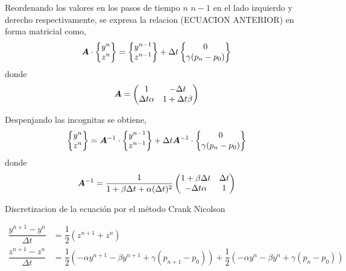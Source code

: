 Reordenando los valores en los pasos de tiempo $n$ $n-1$ en el lado izquierdo y derecho respectivamente, se expresa la relacion (ECUACION ANTERIOR) en forma matricial como,
\begin{equation}
\boldsymbol{A} \cdot \begin{Bmatrix}
y^n \\ z^n
\end{Bmatrix} =
\begin{Bmatrix}
y^{n-1} \\ z^{n-1}
\end{Bmatrix} +
\Delta t \begin{Bmatrix}
0 \\ \gamma (p_n-p_0)
\end{Bmatrix}
\end{equation}
donde
\begin{equation}
\boldsymbol{A} = \begin{pmatrix}
1 & -\Delta t \\
\Delta t \alpha & 1+ \Delta t \beta
\end{pmatrix}
\end{equation}


Despenjando las incognitas se obtiene,
\begin{equation}
\begin{Bmatrix}
y^n \\ z^n
\end{Bmatrix} =
\boldsymbol{A}^{-1} \cdot \begin{Bmatrix}
y^{n-1} \\ z^{n-1}
\end{Bmatrix} +
\Delta t \boldsymbol{A}^{-1} \cdot  \begin{Bmatrix}
0 \\ \gamma (p_n-p_0)
\end{Bmatrix}
\end{equation}
donde
\begin{equation}
\boldsymbol{A}^{-1} = 
\dfrac{1}{1 + \beta \Delta t + \alpha (\Delta t) ^ 2}
\begin{pmatrix}
1+\beta \Delta t & \Delta t \\
-\Delta t \alpha & 1 
\end{pmatrix}
\end{equation}


Discretizacion de la ecuación por el método Crank Nicolson

\begin{align}
\dfrac{y^{n+1}-y^n}{\Delta t} & = \dfrac{1}{2} \left( z^{n+1} + z^n \right) \\
\dfrac{z^{n+1}-z^n}{\Delta t} &= \dfrac{1}{2} \left( -\alpha y^{n+1} - \beta y^{n+1} + \gamma (p_{n+1}-p_0) \right) + \dfrac{1}{2} \left( -\alpha y^{n} - \beta y^{n} + \gamma (p_{n}-p_0) \right)  
\end{align}

